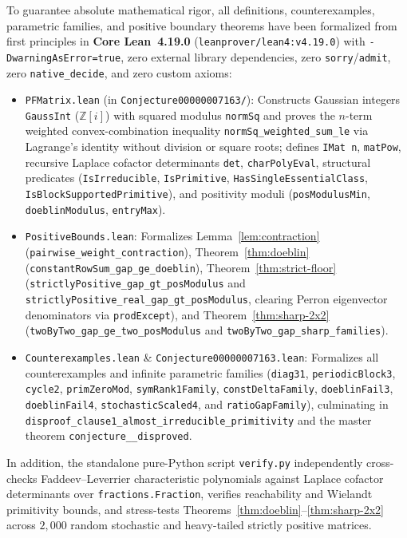 \documentclass[11pt]{article}
\theoremstyle{definition}
\newcommand{\Z}{\mathbb{Z}}
\begin{document}
{\sloppy
To guarantee absolute mathematical rigor, all definitions, counterexamples, parametric families, and positive boundary theorems have been formalized from first principles in \textbf{Core Lean~4.19.0} (\texttt{leanprover/lean4:v4.19.0}) with \texttt{-DwarningAsError=true}, zero external library dependencies, zero \texttt{sorry}/\texttt{admit}, zero \texttt{native\_decide}, and zero custom axioms:
\begin{itemize}
  \item \texttt{PFMatrix.lean} (in \texttt{Conjecture00000007163/}): Constructs Gaussian integers \texttt{GaussInt} ($\Z[i]$) with squared modulus \texttt{normSq} and proves the $n$-term weighted convex-combination inequality \texttt{normSq\_\allowbreak weighted\_\allowbreak sum\_\allowbreak le} via Lagrange's identity without division or square roots; defines \texttt{IMat n}, \texttt{matPow}, recursive Laplace cofactor determinants \texttt{det}, \texttt{charPolyEval}, structural predicates (\texttt{IsIrreducible}, \texttt{IsPrimitive}, \texttt{HasSingleEssentialClass}, \texttt{IsBlockSupportedPrimitive}), and positivity moduli (\texttt{posModulusMin}, \texttt{doeblinModulus}, \texttt{entryMax}).
  \item \texttt{PositiveBounds.lean}: Formalizes Lemma~\ref{lem:contraction} (\texttt{pairwise\_\allowbreak weight\_\allowbreak contraction}), Theorem~\ref{thm:doeblin} (\texttt{constantRowSum\_\allowbreak gap\_\allowbreak ge\_\allowbreak doeblin}), Theorem~\ref{thm:strict-floor} (\texttt{strictlyPositive\_\allowbreak gap\_\allowbreak gt\_\allowbreak posModulus} and \texttt{strictlyPositive\_\allowbreak real\_\allowbreak gap\_\allowbreak gt\_\allowbreak posModulus}, clearing Perron eigenvector denominators via \texttt{prodExcept}), and Theorem~\ref{thm:sharp-2x2} (\texttt{twoByTwo\_\allowbreak gap\_\allowbreak ge\_\allowbreak two\_\allowbreak posModulus} and \texttt{twoByTwo\_\allowbreak gap\_\allowbreak sharp\_\allowbreak families}).
  \item \texttt{Counterexamples.lean} \& \texttt{Conjecture00000007163.lean}: Formalizes all counterexamples and infinite parametric families (\texttt{diag31}, \texttt{periodicBlock3}, \texttt{cycle2}, \texttt{primZeroMod}, \texttt{symRank1Family}, \texttt{constDeltaFamily}, \texttt{doeblinFail3}, \texttt{doeblinFail4}, \texttt{stochasticScaled4}, and \texttt{ratioGapFamily}), culminating in \texttt{disproof\_\allowbreak clause1\_\allowbreak almost\_\allowbreak irreducible\_\allowbreak primitivity} and the master theorem \texttt{conjecture\_\_\allowbreak disproved}.
\end{itemize}
In addition, the standalone pure-Python script \texttt{verify.py} independently cross-checks Faddeev--Leverrier characteristic polynomials against Laplace cofactor determinants over \texttt{fractions.\allowbreak Fraction}, verifies reachability and Wielandt primitivity bounds, and stress-tests Theorems~\ref{thm:doeblin}--\ref{thm:sharp-2x2} across $2{,}000$ random stochastic and heavy-tailed strictly positive matrices.
\par}
\end{document}
